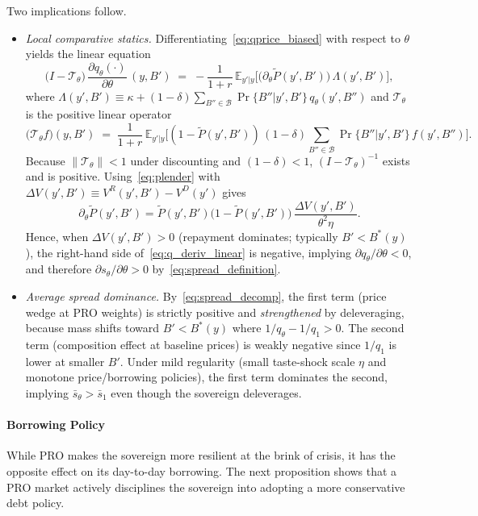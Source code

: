 \documentclass[12pt]{article}
\theoremstyle{plain}
\newcommand{\E}{\mathbb{E}}
\begin{document}
Two implications follow.
\begin{itemize}
	\item \emph{Local comparative statics.} Differentiating~\eqref{eq:qprice_biased} with respect to $\theta$ yields the linear equation
	      \begin{equation}\label{eq:q_deriv_linear}
		      \big(I - \mathcal T_\theta\big)\,\frac{\partial q_\theta(\cdot)}{\partial\theta}\,(y,B') \;=\; -\frac{1}{1+r}\,\E_{y'|y}\Big[\big(\partial_\theta \tilde P(y',B')\big)\,\Lambda(y',B')\Big],
	      \end{equation}
	      where $\Lambda(y',B')\equiv \kappa + (1-\delta)\sum_{B''\in\mathcal B} \Pr\{B''|y',B'\}\,q_\theta(y',B'')$ and $\mathcal T_\theta$ is the positive linear operator
	      \[\big(\mathcal T_\theta f\big)(y,B') \;=\; \frac{1}{1+r}\,\E_{y'|y}\Big[(1-\tilde P(y',B'))\,(1-\delta)\sum_{B''\in\mathcal B} \Pr\{B''|y',B'\}\, f(y',B'')\Big].\]
	      Because $\|\mathcal T_\theta\|<1$ under discounting and $(1-\delta)<1$,
	      $(I-\mathcal T_\theta)^{-1}$ exists and is positive. Using~\eqref{eq:plender}
	      with $\Delta V(y',B')\equiv V^R(y',B')-V^D(y')$ gives
	      \[\partial_\theta \tilde P(y',B')
		      = \tilde P(y',B')\big(1-\tilde P(y',B')\big)\,\frac{\Delta V(y',B')}{\theta^2\eta}.\]
	      Hence, when $\Delta V(y',B')>0$ (repayment dominates; typically $B'<B^*(y)$),
	      the right-hand side of~\eqref{eq:q_deriv_linear} is negative, implying
	      $\partial q_\theta/\partial\theta<0$, and therefore $\partial
		      s_\theta/\partial\theta>0$ by~\eqref{eq:spread_definition}.
	\item \emph{Average spread dominance.} By~\eqref{eq:spread_decomp}, the first term (price wedge at PRO weights) is strictly positive and \emph{strengthened} by deleveraging, because mass shifts toward $B'<B^*(y)$ where $1/q_\theta - 1/q_1>0$. The second term (composition effect at baseline prices) is weakly negative since $1/q_1$ is lower at smaller $B'$. Under mild regularity (small taste-shock scale $\eta$ and monotone price/borrowing policies), the first term dominates the second, implying $\bar s_\theta>\bar s_1$ even though the sovereign deleverages.
\end{itemize}

\paragraph{Borrowing Policy}
While PRO makes the sovereign more resilient at the brink of crisis, it has the
opposite effect on its day-to-day borrowing. The next proposition shows that a
PRO market actively disciplines the sovereign into adopting a more conservative
debt policy.
\end{document}

